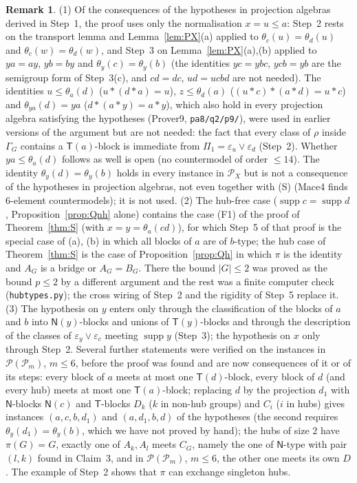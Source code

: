 \documentclass[11pt]{amsart}
\theoremstyle{definition}
\newtheorem{remark}[theorem]{Remark}
\renewcommand{\P}{\mathcal{P}}
\newcommand{\supp}{\operatorname{supp}}
\newcommand{\T}{\mathsf{T}}
\newcommand{\N}{\mathsf{N}}
\begin{document}
\begin{remark}\label{rem:Q}
(1) Of the consequences of the hypotheses in projection algebras derived in Step~1, the proof uses only the normalisation $x=u\le a$: Step~2 rests on the transport lemma and Lemma~\ref{lem:PX}(a) applied to $\theta_c(u)=\theta_d(u)$ and $\theta_c(w)=\theta_d(w)$, and Step~3 on Lemma~\ref{lem:PX}(a),(b) applied to $ya=ay$, $yb=by$ and $\theta_y(c)=\theta_y(b)$ (the identities $yc=ybc$, $ycb=yb$ are the semigroup form of Step~3(c), and $cd=dc$, $ud=ucbd$ are not needed). The identities $u\le\theta_a(d)$ ($u*(d*a)=u$), $z\le\theta_d(a)$ ($(u*c)*(a*d)=u*c$) and $\theta_{ya}(d)=ya$ ($d*(a*y)=a*y$), which also hold in every projection algebra satisfying the hypotheses (Prover9, \texttt{pa8/q2/p9/}), were used in earlier versions of the argument but are not needed: the fact that every class of $\rho$ inside $\Gamma_G$ contains a $\T(a)$-block is immediate from $\Pi_1=\varepsilon_u\vee\varepsilon_d$ (Step~2). Whether $ya\le\theta_a(d)$ follows as well is open (no countermodel of order $\le14$). The identity $\theta_y(d)=\theta_y(b)$ holds in every instance in $\P_X$ but is not a consequence of the hypotheses in projection algebras, not even together with (S) (Mace4 finds $6$-element countermodels); it is not used.
(2) The hub-free case ($\supp c=\supp d$, Proposition~\ref{prop:Qnh} alone) contains the case (F1) of the proof of Theorem~\ref{thm:S} (with $x=y=\theta_a(cd)$), for which Step~5 of that proof is the special case of (a), (b) in which all blocks of $a$ are of $b$-type; the hub case of Theorem~\ref{thm:S} is the case of Proposition~\ref{prop:Qh} in which $\pi$ is the identity and $A_G$ is a bridge or $A_G=B_G$. There the bound $|G|\le2$ was proved as the bound $p\le2$ by a different argument and the rest was a finite computer check (\texttt{hubtypes.py}); the cross wiring of Step~2 and the rigidity of Step~5 replace it.
(3) The hypothesis on $y$ enters only through the classification of the blocks of $a$ and $b$ into $\N(y)$-blocks and unions of $\T(y)$-blocks and through the description of the classes of $\varepsilon_y\vee\varepsilon_c$ meeting $\supp y$ (Step~3); the hypothesis on $x$ only through Step~2. Several further statements were verified on the instances in $\P(\P_m)$, $m\le6$, before the proof was found and are now consequences of it or of its steps: every block of $a$ meets at most one $\T(d)$-block, every block of $d$ (and every hub) meets at most one $\T(a)$-block; replacing $d$ by the projection $d_1$ with $\N$-blocks $\N(c)$ and $\T$-blocks $D_k$ ($k$ in non-hub groups) and $C_i$ ($i$ in hubs) gives instances $(a,c,b,d_1)$ and $(a,d_1,b,d)$ of the hypotheses (the second requires $\theta_y(d_1)=\theta_y(b)$, which we have not proved by hand); the hubs of size $2$ have $\pi(G)=G$, exactly one of $A_k,A_l$ meets $C_G$, namely the one of $\N$-type with pair $(l,k)$ found in Claim~3, and in $\P(\P_m)$, $m\le6$, the other one meets its own $D$. The example of Step~2 shows that $\pi$ can exchange singleton hubs.
\end{remark}
\end{document}
